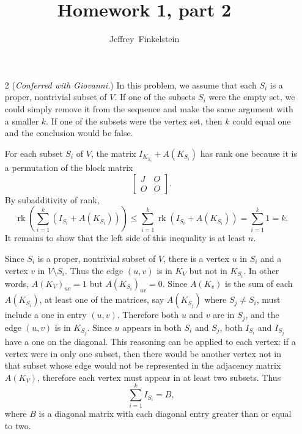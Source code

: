 \documentclass{article}
\author{Jeffrey~Finkelstein}
\title{Homework 1, part 2}
\newcommand{\1}{\mathbf{1}}
\newcommand{\0}{\mathbf{0}}
\DeclareMathOperator{\rk}{rk}
\begin{document}
\maketitle

\begin{enumerate}
\item[2]
  (\emph{Conferred with Giovanni.})
  In this problem, we assume that each $S_i$ is a proper, nontrivial subset of $V$.
  If one of the subsets $S_i$ were the empty set, we could simply remove it from the sequence and make the same argument with a smaller $k$.
  If one of the subsets were the vertex set, then $k$ could equal one and the conclusion would be false.

  For each subset $S_i$ of $V$, the matrix $I_{K_{S_i}} + A(K_{S_i})$ has rank one because it is a permutation of the block matrix
  \begin{equation*}
    \begin{bmatrix}
      J & O \\
      O & O
    \end{bmatrix}.
  \end{equation*}
  By subadditivity of rank,
  \begin{equation*}
    \rk\left(\sum_{i = 1}^k (I_{S_i} + A(K_{S_i}))\right) \leq \sum_{i = 1}^k \rk(I_{S_i} + A(K_{S_i})) = \sum_{i = 1}^k 1 = k.
  \end{equation*}
  It remains to show that the left side of this inequality is at least $n$.

  Since $S_i$ is a proper, nontrivial subset of $V$, there is a vertex $u$ in $S_i$ and a vertex $v$ in $V \setminus S_i$.
  Thus the edge $(u, v)$ is in $K_V$ but not in $K_{S_i}$.
  In other words, $A(K_V)_{uv} = 1$ but $A(K_{S_i})_{uv} = 0$.
  Since $A(K_v)$ is the sum of each $A(K_{S_i})$, at least one of the matrices, say $A(K_{S_j})$ where $S_j \neq S_i$, must include a one in entry $(u, v)$.
  Therefore both $u$ and $v$ are in $S_j$, and the edge $(u, v)$ is in $K_{S_j}$.
  Since $u$ appears in both $S_i$ and $S_j$, both $I_{S_i}$ and $I_{S_j}$ have a one on the diagonal.
  This reasoning can be applied to each vertex: if a vertex were in only one subset, then there would be another vertex not in that subset whose edge would not be represented in the adjacency matrix $A(K_V)$, therefore each vertex must appear in at least two subsets.
  Thus
  \begin{equation*}
    \sum_{i = 1}^k I_{S_i} = B,
  \end{equation*}
  where $B$ is a diagonal matrix with each diagonal entry greater than or equal to two.


\end{enumerate}
\end{document}
